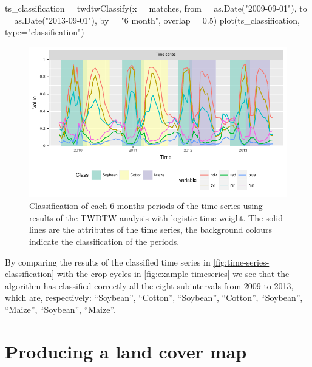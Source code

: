 \documentclass[article,shortnames]{jss}
\begin{document}
\begin{CodeChunk}
\begin{CodeInput}
ts_classification = twdtwClassify(x = matches, 
  from = as.Date("2009-09-01"), to = as.Date("2013-09-01"), 
  by = "6 month", overlap = 0.5)
plot(ts_classification, type="classification")
\end{CodeInput}
\begin{figure}[!ht]

{\centering \includegraphics{applying_twdtw_files/figure-latex/time-series-classification-1} 

}

\caption[Classification of each 6 months periods of the time series using results of the TWDTW analysis with logistic time-weight]{Classification of each 6 months periods of the time series using results of the TWDTW analysis with logistic time-weight. The solid lines are the attributes of the time series, the background colours indicate the classification of the periods.}\label{fig:time-series-classification}
\end{figure}
\end{CodeChunk}

By comparing the results of the classified time series in
\autoref{fig:time-series-classification} with the crop cycles in
\autoref{fig:example-timeseries} we see that the algorithm has
classified correctly all the eight subintervals from 2009 to 2013, which
are, respectively: ``Soybean'', ``Cotton'', ``Soybean'', ``Cotton'',
``Soybean'', ``Maize'', ``Soybean'', ``Maize''.

\section{Producing a land cover map}\label{producing-a-land-cover-map}
\end{document}
